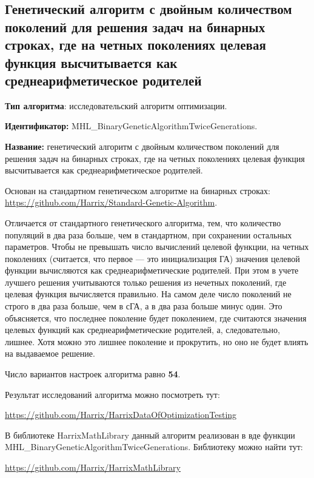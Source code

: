\subsection{Генетический алгоритм с двойным количеством поколений для решения задач на бинарных строках, где на четных поколениях целевая функция высчитывается как среднеарифметическое родителей}\label{HarrixOptimizationAlgorithms:MHL_BinaryGeneticAlgorithmTwiceGenerations}

\textbf{Тип алгоритма}: исследовательский алгоритм оптимизации.

\textbf{Идентификатор:} MHL\_BinaryGeneticAlgorithmTwiceGenerations.

\textbf{Название:} генетический алгоритм с двойным количеством поколений для решения задач на бинарных строках, где на четных поколениях целевая функция высчитывается как среднеарифметическое родителей.

Основан на стандартном генетическом алгоритме на бинарных строках:  \href{https://github.com/Harrix/Standard-Genetic-Algorithm}{https://github.com/Harrix/Standard-Genetic-Algorithm}.

Отличается от стандартного генетического алгоритма, тем, что количество популяций в два раза больше, чем в стандартном, при сохранении остальных параметров. Чтобы не превышать число вычислений целевой функции, на четных поколениях (считается, что первое --- это инициализация ГА) значения целевой функции вычисляются как среднеарифметические родителей. При этом в учете лучшего решения учитываются только решения из нечетных поколений, где целевая функция вычисляется правильно. На самом деле число поколений не строго в два раза больше, чем в сГА, а в два раза больше минус один. Это объясняется, что последнее поколение будет поколением, где считаются значения целевых функций как среднеарифметические родителей, а, следовательно, лишнее. Хотя можно это лишнее поколение и прокрутить, но оно не будет влиять на выдаваемое решение.

Число вариантов настроек алгоритма равно \textbf{54}.

Результат исследований алгоритма можно посмотреть тут:

\href{https://github.com/Harrix/HarrixDataOfOptimizationTesting}{https://github.com/Harrix/HarrixDataOfOptimizationTesting}

В библиотеке HarrixMathLibrary данный алгоритм реализован в вде функции MHL\_BinaryGeneticAlgorithmTwiceGenerations. Библиотеку можно найти тут:

\href{https://github.com/Harrix/HarrixMathLibrary}{https://github.com/Harrix/HarrixMathLibrary}